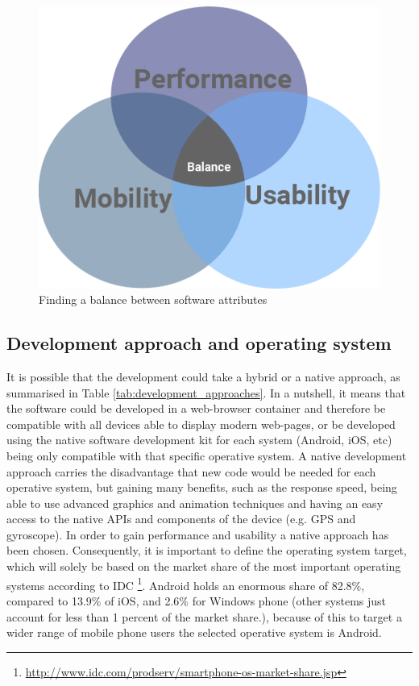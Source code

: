 \begin{figure}[H]
\begin{adjustbox}{width=.5\textwidth,center=\textwidth}
  \centering
  \includegraphics[scale=1]{images/balanceCircles.png}
\end{adjustbox}
  \caption[Finding a balance between software attributes]{Finding a balance between software attributes}
  \label{fig:balance_attributes}
\end{figure}

\subsection{Development approach and operating system}
It is possible that the development could take a hybrid or a native approach, as summarised in Table \ref{tab:development_approaches}. In a nutshell, it means that the software could be developed in a web-browser container and therefore be compatible with all devices able to display modern web-pages, or be developed using the native software development kit for each system (Android, iOS, etc) being only compatible with that specific operative system. A native development approach carries the disadvantage that new code would be needed for each operative system, but gaining many benefits, such as the response speed, being able to use advanced graphics and animation techniques and having an easy access to the native APIs and components of the device (e.g. GPS and gyroscope). In order to gain performance and usability a native approach has been chosen. Consequently, it is important to define the operating system target, which will solely be based on the market share of the most important operating systems according to IDC \footnote{\url{http://www.idc.com/prodserv/smartphone-os-market-share.jsp}}. Android holds an enormous share of 82.8\%, compared to 13.9\% of iOS, and 2.6\% for Windows phone (other systems just account for less than 1 percent of the market share.), because of this to target a wider range of mobile phone users the selected operative system is Android.

